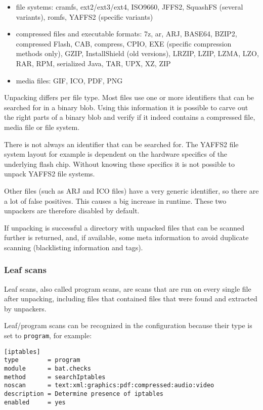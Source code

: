 \documentclass[10pt]{article}
\begin{document}
\begin{itemize}
\item file systems: cramfs, ext2/ext3/ext4, ISO9660, JFFS2, SquashFS (several
variants), romfs, YAFFS2 (specific variants)
\item compressed files and executable formats: 7z, ar, ARJ, BASE64, BZIP2,
compressed Flash, CAB, compress, CPIO, EXE (specific compression methods only),
GZIP, InstallShield (old versions), LRZIP, LZIP, LZMA, LZO, RAR, RPM, serialized
Java, TAR, UPX, XZ, ZIP
\item media files: GIF, ICO, PDF, PNG
\end{itemize}

Unpacking differs per file type. Most files use one or more identifiers that
can be searched for in a binary blob. Using this information it is possible
to carve out the right parts of a binary blob and verify if it indeed contains
a compressed file, media file or file system.

There is not always an identifier that can be searched for. The YAFFS2 file
system layout for example is dependent on the hardware specifics of the
underlying flash chip. Without knowing these specifics it is not possible to
unpack YAFFS2 file systems.

Other files (such as ARJ and ICO files) have a very generic identifier, so
there are a lot of false positives. This causes a big increase in runtime.
These two unpackers are therefore disabled by default.

If unpacking is successful a directory with unpacked files that can be
scanned further is returned, and, if available, some meta information to avoid
duplicate scanning (blacklisting information and tags).

\subsubsection{Leaf scans}

Leaf scans, also called program scans, are scans that are run on every single
file after unpacking, including files that contained files that were found
and extracted by unpackers.

Leaf/program scans can be recognized in the configuration because their type is
set to \texttt{program}, for example:

\begin{verbatim}
[iptables]
type        = program
module      = bat.checks
method      = searchIptables
noscan      = text:xml:graphics:pdf:compressed:audio:video
description = Determine presence of iptables
enabled     = yes
\end{verbatim}
\end{document}
